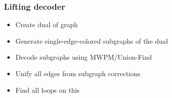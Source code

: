 \subsubsection{Lifting decoder}
\begin{itemize}
    \item Create dual of graph
    \item Generate single-edge-colored subgraphs of the dual
    \item Decode subgraphs using MWPM/Union-Find
    \item Unify all edges from subgraph corrections
    \item Find all loops on this
\end{itemize}